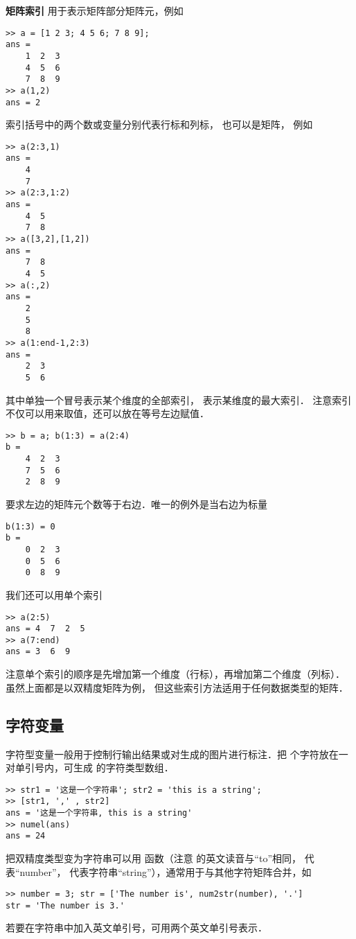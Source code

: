 \textbf{矩阵索引} 用于表示矩阵部分矩阵元，例如
\begin{lstlisting}[language=MatlabCom]
>> a = [1 2 3; 4 5 6; 7 8 9];
ans =
    1  2  3
    4  5  6
    7  8  9
>> a(1,2)
ans = 2
\end{lstlisting}
索引括号中的两个数或变量分别代表行标和列标， 也可以是矩阵， 例如
\begin{lstlisting}[language=MatlabCom]
>> a(2:3,1)
ans =
    4
    7
>> a(2:3,1:2)
ans =
    4  5
    7  8
>> a([3,2],[1,2])
ans =
    7  8
    4  5
>> a(:,2)
ans =
    2
    5
    8
>> a(1:end-1,2:3)
ans =
    2  3
    5  6
\end{lstlisting}
其中单独一个冒号表示某个维度的全部索引，  表示某维度的最大索引． 注意索引不仅可以用来取值，还可以放在等号左边赋值．
\begin{lstlisting}[language=MatlabCom]
>> b = a; b(1:3) = a(2:4)
b =
    4  2  3
    7  5  6
    2  8  9
\end{lstlisting}
要求左边的矩阵元个数等于右边．唯一的例外是当右边为标量
\begin{lstlisting}[language=MatlabCom]
b(1:3) = 0
b =
    0  2  3
    0  5  6
    0  8  9 
\end{lstlisting}
我们还可以用单个索引 %
\begin{lstlisting}[language=MatlabCom]
>> a(2:5)
ans = 4  7  2  5
>> a(7:end)
ans = 3  6  9
\end{lstlisting}
注意单个索引的顺序是先增加第一个维度（行标），再增加第二个维度（列标）． 虽然上面都是以双精度矩阵为例， 但这些索引方法适用于任何数据类型的矩阵．

\subsection{字符变量}

字符型变量一般用于控制行输出结果或对生成的图片进行标注．把  个字符放在一对单引号内，可生成  的字符类型数组．
\begin{lstlisting}[language=MatlabCom]
>> str1 = '这是一个字符串'; str2 = 'this is a string';
>> [str1, ',' , str2]
ans = '这是一个字符串, this is a string'
>> numel(ans)
ans = 24
\end{lstlisting}
把双精度类型变为字符串可以用  函数（注意  的英文读音与“to”相同，  代表“number”，  代表字符串“string”），通常用于与其他字符矩阵合并，如
\begin{lstlisting}[language=MatlabCom]
>> number = 3; str = ['The number is', num2str(number), '.']
str = 'The number is 3.'
\end{lstlisting}
若要在字符串中加入英文单引号，可用两个英文单引号表示．

